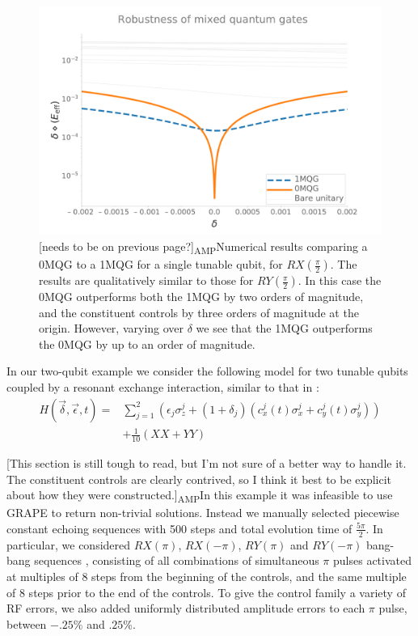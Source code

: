 \documentclass[aps,nofootinbib,pra,notitlepage,twocolumn]{revtex4-1}
\newcommand{\amp}[1]{{\color{red}[#1]\textsubscript{\rm{AMP}}}}
\begin{document}
\begin{figure}[h]
  \centering
  \includegraphics[width=\columnwidth]{figures/1q_robustness_delta.pdf}
  \caption{\amp{needs to be on previous page?}Numerical results comparing a 0MQG to a 1MQG for a single tunable qubit, for $RX(\frac{\pi}{2})$. The results are qualitatively similar to those for $RY(\frac{\pi}{2})$. In this case the 0MQG outperforms both the 1MQG by two orders of magnitude, and the constituent controls by three orders of magnitude at the origin. However, varying over $\delta$ we see that the 1MQG outperforms the 0MQG by up to an order of magnitude.}
  \label{fig:YMQG}
\end{figure}

In our two-qubit example we consider the following model for two tunable qubits coupled by a resonant exchange interaction, similar to that in \cite{McKay2016}:
\begin{equation} \label{eq:2Qham}
\begin{split}
H(\vec{\delta}, \vec{\epsilon}, t) = &\sum_{j=1}^2(\epsilon_j\sigma_z^j + (1 + \delta_j)(c_x^j(t)\sigma_x^j + c_y^j(t)\sigma_y^j)) \\
&+ \frac{1}{10}(XX + YY)
\end{split}
\end{equation}

\amp{This section is still tough to read, but I'm not sure of a better way to handle it. The constituent controls are clearly contrived, so I think it best to be explicit about how they were constructed.}In this example it was infeasible to use GRAPE to return non-trivial solutions. Instead we manually selected piecewise constant echoing sequences with 500 steps and total evolution time of $\frac{5\pi}{2}$. In particular, we considered $RX(\pi)$, $RX(-\pi)$, $RY(\pi)$ and $RY(-\pi)$ bang-bang sequences \cite{bangbang}, consisting of all combinations of simultaneous $\pi$ pulses activated at multiples of $8$ steps from the beginning of the controls, and the same multiple of $8$ steps prior to the end of the controls. To give the control family a variety of RF errors, we also added uniformly distributed amplitude errors to each $\pi$ pulse, between $-.25$\% and $.25$\%.
\end{document}
